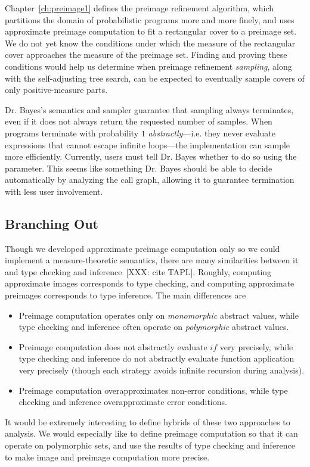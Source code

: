 Chapter~\ref{ch:preimage1} defines the preimage refinement algorithm, which partitions the domain of probabilistic programs more and more finely, and uses approximate preimage computation to fit a rectangular cover to a preimage set.
We do not yet know the conditions under which the measure of the rectangular cover approaches the measure of the preimage set.
Finding and proving these conditions would help us determine when preimage refinement \emph{sampling}, along with the self-adjusting tree search, can be expected to eventually sample covers of only positive-measure parts.

Dr. Bayes's semantics and sampler guarantee that sampling always terminates, even if it does not always return the requested number of samples.
When programs terminate with probability $1$ \emph{abstractly}---i.e. they never evaluate expressions that cannot escape infinite loops---the implementation can sample more efficiently.
Currently, users must tell Dr. Bayes whether to do so using the  parameter.
This seems like something Dr. Bayes should be able to decide automatically by analyzing the call graph, allowing it to guarantee termination with less user involvement.

\subsection{Branching Out}

Though we developed approximate preimage computation only so we could implement a measure-theoretic semantics, there are many similarities between it and type checking and inference~[XXX: cite TAPL].
Roughly, computing approximate images corresponds to type checking, and computing approximate preimages corresponds to type inference.
The main differences are
\begin{itemize}
	\item Preimage computation operates only on \emph{monomorphic} abstract values, while type checking and inference often operate on \emph{polymorphic} abstract values.
	\item Preimage computation does not abstractly evaluate $if$ very precisely, while type checking and inference do not abstractly evaluate function application very precisely
	(though each strategy avoids infinite recursion during analysis).
	\item Preimage computation overapproximates non-error conditions, while type checking and inference overapproximate error conditions.
\end{itemize}
It would be extremely interesting to define hybrids of these two approaches to analysis.
We would especially like to define preimage computation so that it can operate on polymorphic sets, and use the results of type checking and inference to make image and preimage computation more precise.

